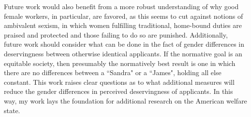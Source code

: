 \documentclass[12pt]{article}%
\begin{document}
\begin{doublespace}
Future work would also benefit from a more robust understanding of why good female workers, in particular, are favored, as this seems to cut against notions of ambivalent sexism, in which women fulfilling traditional, home-bound duties are praised and protected and those failing to do so are punished. Additionally, future work should consider what can be done in the fact of gender differences in deservingness between otherwise identical applicants. If the normative goal is an equitable society, then presumably the normatively best result is one in which there are no differences between a ``Sandra" or a ``James", holding all else constant. This work raises clear questions as to what additional measures will reduce the gender differences in perceived deservingness of applicants. In this way, my work lays the foundation for additional research on the American welfare state.

\end{doublespace}

\pagebreak


\end{document}
